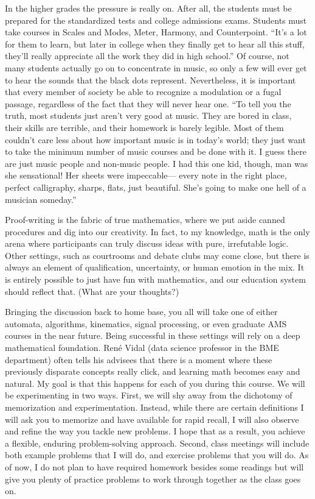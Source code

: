 \documentclass[11pt]{article}
\theoremstyle{plain}
\theoremstyle{definition}
\theoremstyle{remark}
\begin{document}
In the higher grades the pressure is really on. After all, the students must be prepared for the standardized tests and college admissions exams. Students must take courses in Scales and Modes, Meter, Harmony, and Counterpoint. ``It’s a lot for them to learn, but later in college when they finally get to hear all this stuff, they’ll really appreciate all the work they did in high school.” Of course, not many students actually go on to concentrate in music, so only a few will ever get to hear the sounds that the black dots represent. Nevertheless, it is important that every member of society be able to recognize a modulation or a fugal passage, regardless of the fact that they will never hear one. ``To tell you the truth, most students just aren’t very good at music. They are bored in class, their skills are terrible, and their homework is barely legible. Most of them couldn’t care less about how important music is in today’s world; they just want to take the minimum number of music courses and be done with it. I guess there are just music people and non-music people. I had this one kid, though, man was she sensational! Her sheets were impeccable— every note in the right place, perfect calligraphy, sharps, flats, just beautiful. She’s going to make one hell of a musician someday.”\\

\setlength{\leftskip}{0pt}

Proof-writing is the fabric of true mathematics, where we put aside canned procedures and dig into our creativity. In fact, to my knowledge, math is the only arena where participants can truly discuss ideas with pure, irrefutable logic. Other settings, such as courtrooms and debate clubs may come close, but there is always an element of qualification, uncertainty, or human emotion in the mix. It is entirely possible to just have fun with mathematics, and our education system should reflect that. (What are your thoughts?)

Bringing the discussion back to home base, you all will take one of either automata, algorithms, kinematics, signal processing, or even graduate AMS courses in the near future. Being successful in these settings will rely on a deep mathematical foundation. Ren\'e Vidal (data science professor in the BME department) often tells his advisees that there is a moment where these previously disparate concepts really click, and learning math becomes easy and natural. My goal is that this happens for each of you during this course. We will be experimenting in two ways. First, we will shy away from the dichotomy of memorization and experimentation. Instead, while there are certain definitions I will ask you to memorize and have available for rapid recall, I will also observe and refine the way you tackle new problems. I hope that as a result, you achieve a flexible, enduring problem-solving approach. Second, class meetings will include both example problems that I will do, and exercise problems that you will do. As of now, I do not plan to have required homework besides some readings but will give you plenty of practice problems to work through together as the class goes on.
\end{document}
